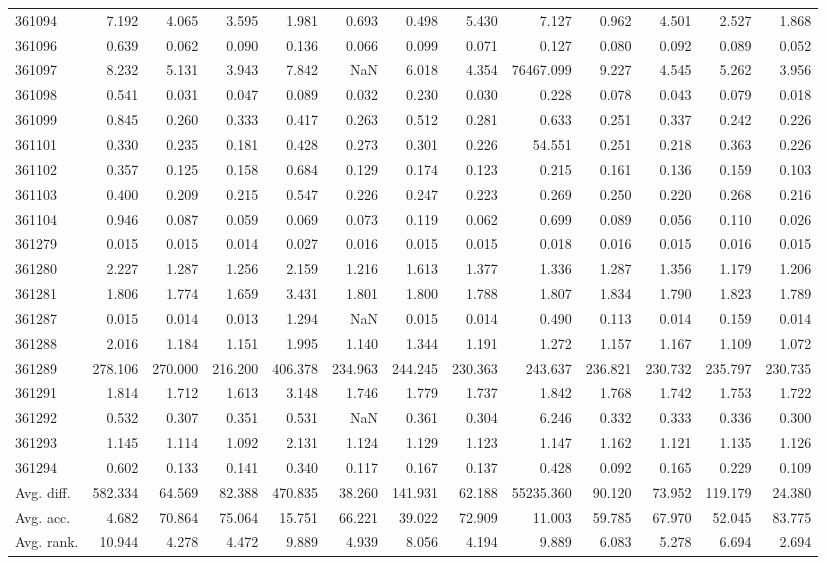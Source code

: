 \begin{tabular}{lrrrrrrrrrrrr}
361094 & 7.192 & 4.065 & 3.595 & 1.981 & 0.693 & 0.498 & 5.430 & 7.127 & 0.962 & 4.501 & 2.527 & 1.868 \\
361096 & 0.639 & 0.062 & 0.090 & 0.136 & 0.066 & 0.099 & 0.071 & 0.127 & 0.080 & 0.092 & 0.089 & 0.052 \\
361097 & 8.232 & 5.131 & 3.943 & 7.842 & NaN & 6.018 & 4.354 & 76467.099 & 9.227 & 4.545 & 5.262 & 3.956 \\
361098 & 0.541 & 0.031 & 0.047 & 0.089 & 0.032 & 0.230 & 0.030 & 0.228 & 0.078 & 0.043 & 0.079 & 0.018 \\
361099 & 0.845 & 0.260 & 0.333 & 0.417 & 0.263 & 0.512 & 0.281 & 0.633 & 0.251 & 0.337 & 0.242 & 0.226 \\
361101 & 0.330 & 0.235 & 0.181 & 0.428 & 0.273 & 0.301 & 0.226 & 54.551 & 0.251 & 0.218 & 0.363 & 0.226 \\
361102 & 0.357 & 0.125 & 0.158 & 0.684 & 0.129 & 0.174 & 0.123 & 0.215 & 0.161 & 0.136 & 0.159 & 0.103 \\
361103 & 0.400 & 0.209 & 0.215 & 0.547 & 0.226 & 0.247 & 0.223 & 0.269 & 0.250 & 0.220 & 0.268 & 0.216 \\
361104 & 0.946 & 0.087 & 0.059 & 0.069 & 0.073 & 0.119 & 0.062 & 0.699 & 0.089 & 0.056 & 0.110 & 0.026 \\
361279 & 0.015 & 0.015 & 0.014 & 0.027 & 0.016 & 0.015 & 0.015 & 0.018 & 0.016 & 0.015 & 0.016 & 0.015 \\
361280 & 2.227 & 1.287 & 1.256 & 2.159 & 1.216 & 1.613 & 1.377 & 1.336 & 1.287 & 1.356 & 1.179 & 1.206 \\
361281 & 1.806 & 1.774 & 1.659 & 3.431 & 1.801 & 1.800 & 1.788 & 1.807 & 1.834 & 1.790 & 1.823 & 1.789 \\
361287 & 0.015 & 0.014 & 0.013 & 1.294 & NaN & 0.015 & 0.014 & 0.490 & 0.113 & 0.014 & 0.159 & 0.014 \\
361288 & 2.016 & 1.184 & 1.151 & 1.995 & 1.140 & 1.344 & 1.191 & 1.272 & 1.157 & 1.167 & 1.109 & 1.072 \\
361289 & 278.106 & 270.000 & 216.200 & 406.378 & 234.963 & 244.245 & 230.363 & 243.637 & 236.821 & 230.732 & 235.797 & 230.735 \\
361291 & 1.814 & 1.712 & 1.613 & 3.148 & 1.746 & 1.779 & 1.737 & 1.842 & 1.768 & 1.742 & 1.753 & 1.722 \\
361292 & 0.532 & 0.307 & 0.351 & 0.531 & NaN & 0.361 & 0.304 & 6.246 & 0.332 & 0.333 & 0.336 & 0.300 \\
361293 & 1.145 & 1.114 & 1.092 & 2.131 & 1.124 & 1.129 & 1.123 & 1.147 & 1.162 & 1.121 & 1.135 & 1.126 \\
361294 & 0.602 & 0.133 & 0.141 & 0.340 & 0.117 & 0.167 & 0.137 & 0.428 & 0.092 & 0.165 & 0.229 & 0.109 \\
Avg. diff. & 582.334 & 64.569 & 82.388 & 470.835 & 38.260 & 141.931 & 62.188 & 55235.360 & 90.120 & 73.952 & 119.179 & 24.380 \\
Avg. acc. & 4.682 & 70.864 & 75.064 & 15.751 & 66.221 & 39.022 & 72.909 & 11.003 & 59.785 & 67.970 & 52.045 & 83.775 \\
Avg. rank. & 10.944 & 4.278 & 4.472 & 9.889 & 4.939 & 8.056 & 4.194 & 9.889 & 6.083 & 5.278 & 6.694 & 2.694 \\
\bottomrule
\end{tabular}
